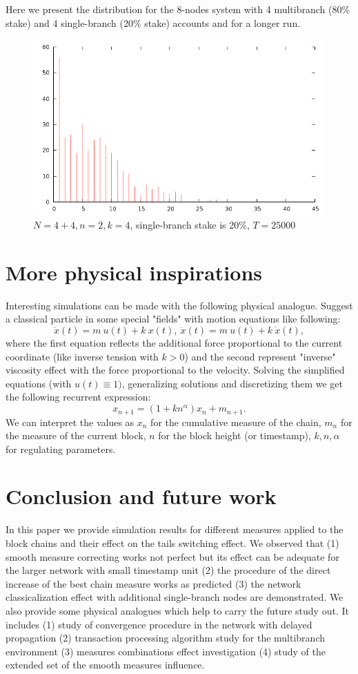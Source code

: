 \documentclass[12pt]{article}
\begin{document}
Here we present the distribution for the $8$-nodes system with 4 multibranch (80\% stake) and 4 single-branch (20\% stake) accounts and for 
a longer run.

\begin{figure}[H]
\centering
\caption{$N=4+4,n=2,k=4$, single-branch stake is 20\%, $T=25000$}
\includegraphics[scale=0.6]{changes-8s20n2k4.png}
\end{figure} 

\section{More physical inspirations}
Interesting simulations can be made with the following physical analogue. Suggest a classical particle in some special "fields" with
motion equations like following:
$$
\ddot x(t) = m\ u(t) + k\ x(t),\ \ddot x(t) = m\ u(t) + k\ \dot x(t),
$$
where the first equation reflects the additional force proportional to the current coordinate (like inverse tension with $k>0$) and the second
represent "inverse" viscosity effect with the force proportional to the velocity. Solving the simplified equations (with $u(t)\equiv 1)$, 
generalizing solutions and discretizing them we get the following recurrent expression:
$$
x_{n+1}=(1+kn^\alpha)x_n + m_{n+1}.
$$
We can interpret the values as $x_n$ for the cumulative measure of the chain, $m_n$ for the measure of the current block, $n$ for the block height (or timestamp),
$k,n,\alpha$ for regulating parameters.


\section{Conclusion and future work}
In this paper we provide simulation results for different measures applied to the block chains and their effect on the tails switching effect.
We observed that (1) smooth measure correcting works not perfect but its effect can be adequate for the larger network with small timestamp unit 
(2) the procedure of the direct increase of the best chain measure works as predicted (3) the network classicalization effect with additional 
single-branch nodes are demonstrated. We also provide some physical analogues which help to carry the future study out. It includes 
(1) study of convergence procedure in the network with delayed propagation (2) transaction processing algorithm study for the multibranch environment
(3) measures combinations effect investigation (4) study of the extended set of the smooth measures influence.
\end{document}
